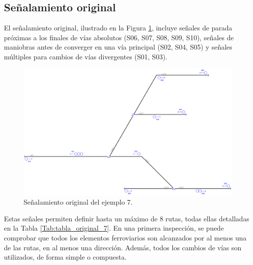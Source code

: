 \subsection{Señalamiento original}

    El señalamiento original, ilustrado en la Figura \ref{fig:EJ7_2}, incluye señales de parada próximas a los finales de vías absolutos (S06, S07, S08, S09, S10), señales de maniobras antes de converger en una vía principal (S02, S04, S05) y señales múltiples para cambios de vías divergentes (S01, S03).
    
    \begin{figure}[H]
    	\centering
    	\includegraphics[width=1\textwidth]{resultados-obtenidos/ejemplo7/images/7_original.png}
    	\centering\caption{Señalamiento original del ejemplo 7.}
    	\label{fig:EJ7_2}
    \end{figure}
    
    Estas señales permiten definir hasta un máximo de 8 rutas, todas ellas detalladas en la Tabla \ref{Tab:tabla_original_7}. En una primera inspección, se puede comprobar que todos los elementos ferroviarios son alcanzados por al menos una de las rutas, en al menos una dirección. Además, todos los cambios de vías son utilizados, de forma simple o compuesta. 
    
